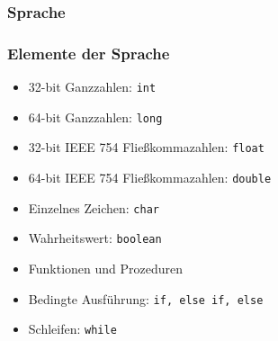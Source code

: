 \documentclass{beamer}
\begin{document}
\subsubsection{Sprache}
\begin{frame}
\frametitle{Elemente der Sprache}
\begin{itemize}
\item  32-bit Ganzzahlen: \texttt{int}
  \item  64-bit Ganzzahlen: \texttt{long}
 \item  32-bit IEEE 754 Fließkommazahlen: \texttt{float}
 \item   64-bit IEEE 754 Fließkommazahlen: \texttt{double}
  \item  Einzelnes Zeichen: \texttt{char}
  \item  Wahrheitswert: \texttt{boolean}
\item Funktionen und Prozeduren %
\item Bedingte Ausführung: \texttt{if, else if, else}
\item Schleifen: \texttt{while}
\end{itemize}
\end{frame}


\end{document}
